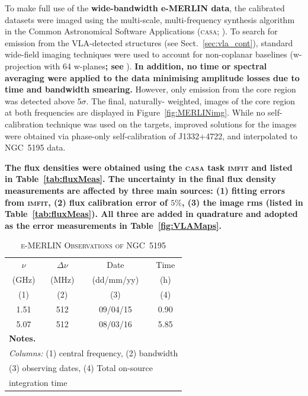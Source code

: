 \documentclass[fleqn,usenatbib]{mnras}
\def\fig{Figure}
\def\sect{Sect.}
\def\tab{Table}
\def\Tab{Table}
\begin{document}
To make full use of the \textbf{wide-bandwidth e-MERLIN data}, the calibrated datasets were imaged using the 
multi-scale, multi-frequency synthesis \citep{RC2011} algorithm in the Common Astronomical Software 
Applications (\textsc{casa}; \citealt{McMullin+07}). To search for emission from the VLA-detected structures (see 
\sect~\ref{sec:vla_cont}), standard wide-field imaging techniques were used to account for non-coplanar 
baselines (w-projection with 64 w-planes\textbf{; see} \cite{Cornwelletal2008}). \textbf{In addition, no 
time or spectral averaging were applied to the data minimising amplitude losses due to time and bandwidth 
smearing.} However, only emission from the core region was detected above 5$\sigma$. The final, naturally-
weighted, images of the core region at both frequencies are displayed in \fig~\ref{fig:MERLINimg}. While 
no self-calibration technique was used on the targets, improved solutions for the
images were obtained via phase-only self-calibration of J1332+4722, and interpolated to NGC~5195 data. 

\textbf{The flux densities were obtained using the \textsc{casa} task \textsc{imfit} and listed in \tab~\ref{tab:fluxMeas}. The uncertainty in the final flux density measurements are affected by three main sources: (1) fitting errors from \textsc{imfit}, (2) flux calibration error of $5\%$, (3) the image rms (listed in \tab~\ref{tab:fluxMeas}). All three are added in quadrature and adopted as the error measurements in \Tab~\ref{fig:VLAMaps}.}  



\begin{center}
\begin{table}\footnotesize
\caption{\textsc{e-MERLIN Observations of NGC~5195}}
\label{tab:eMerObs}
\hfill{}
\begin{tabular}{cccc}
\hline\hline
\noalign{\smallskip}
 $\nu$ & $\Delta\nu$ & Date & Time  \\ 
 (GHz) & (MHz) & (dd/mm/yy)  & (h) \\ 
(1)   & (2)   &  (3) & (4) \\ 
 \hline 
1.51 & 512 & 09/04/15 & 0.90 \\
5.07 & 512 & 08/03/16 & 5.85 \\
\hline
\hline
\multicolumn{4}{l}{\textbf{Notes.}}\\
\multicolumn{4}{l}{\textit{Columns: }(1) central frequency, (2) bandwidth }\\
\multicolumn{4}{l}{(3) observing dates, (4) Total on-source}\\
\multicolumn{4}{l}{integration time}

\end{tabular}
\hfill{}
\end{table}
\end{center}
\end{document}
